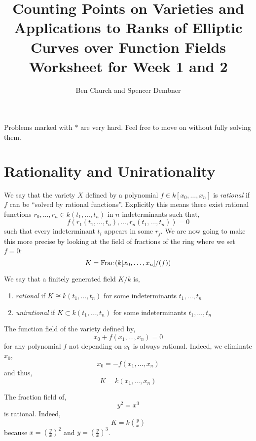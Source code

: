 \documentclass[12pt]{article}
\begin{document}
\title{Counting Points on Varieties and Applications to Ranks of Elliptic Curves over Function Fields \bigskip\\
\Large Worksheet for Week 1 and 2}

\author{Ben Church and Spencer Dembner}

\maketitle 

Problems marked with $*$ are very hard. Feel free to move on without fully solving them. 

\section{Rationality and Unirationality}

\newcommand{\lcm}{\mathrm{lcm}}

We say that the variety $X$ defined by a polynomial $f \in k[x_0, \dots, x_n]$ is \textit{rational} if $f$ can be ``solved by rational functions''. Explicitly this means there exist rational functions $r_0, \dots, r_n \in k(t_1, \dots, t_n)$ in $n$ indeterminants such that,
\[ f(r_1(t_1, \dots, t_n), \dots, r_n(t_1, \dots, t_n)) = 0 \]
such that every indeterminant $t_i$ appears in some $r_j$. We are now going to make this more precise by looking at the field of fractions of the ring where we set $f = 0$:
\[ K = \mathrm{Frac}\left(k[x_0, \dots, x_n]/(f)\right) \]

\begin{defn}
We say that a finitely generated field $K / k$ is,
\begin{enumerate}
\item \textit{rational} if $K \cong k(t_1, \dots, t_n)$ for some indeterminants $t_1, \dots, t_n$

\item \textit{unirational} if $K \subset k(t_1, \dots, t_n)$ for some indeterminants $t_1, \dots, t_n$
\end{enumerate}
\end{defn}

\begin{example}
The function field of the variety defined by,
\[ x_0 + f(x_1, \dots, x_n) = 0 \]
for any polynomial $f$ not depending on $x_0$ is always rational. Indeed, we eliminate $x_0$,
\[ x_0 = - f(x_1, \dots, x_n) \]
and thus,
\[ K = k(x_1, \dots, x_n) \]
\end{example}

\begin{example}
The fraction field of,
\[ y^2 = x^3 \]
is rational. Indeed,
\[ K = k(\tfrac{y}{x}) \]
because $x = (\tfrac{y}{x})^2$ and $y = (\tfrac{y}{x})^3$. 
\end{example}
\end{document}
